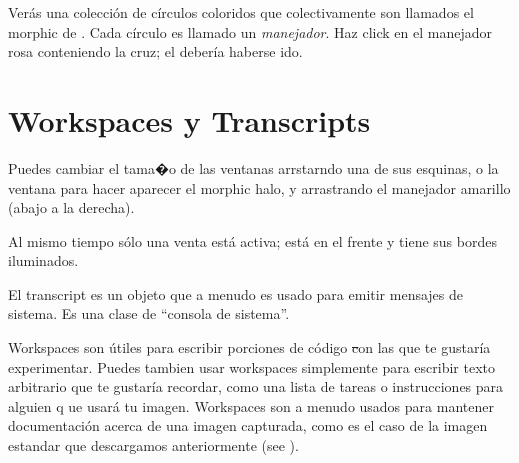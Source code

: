 \documentclass[a4paper,10pt,twoside]{book}
\begin{document}
Ver\'as una colecci\'on de c\'irculos coloridos que colectivamente son llamados el morphic  de \bam.
Cada c\'irculo es llamado un \emph{manejador}.
Haz click en el manejador rosa conteniendo la cruz; el \bam deber\'ia haberse ido. 

\section{Workspaces y Transcripts}


Puedes cambiar el tama�o de las ventanas arrstarndo una de sus esquinas, o  la ventana para hacer aparecer el morphic halo, y arrastrando el manejador amarillo (abajo a la derecha).

Al mismo tiempo s\'olo una venta est\'a activa; est\'a en el frente y tiene sus bordes iluminados.

El transcript es un objeto que a menudo es usado para emitir mensajes de sistema.
Es una clase de ``consola de sistema''.

Workspaces son \'utiles para escribir porciones de c\'odigo \st con las que te gustar\'ia experimentar.
Puedes tambien usar workspaces simplemente para escribir texto arbitrario que te gustar\'ia recordar, como una lista de tareas o instrucciones para alguien q ue usar\'a tu imagen.
Workspaces son a menudo usados para mantener documentaci\'on acerca de una imagen capturada, como es el caso de la imagen estandar que descargamos anteriormente (see ).
\end{document}
